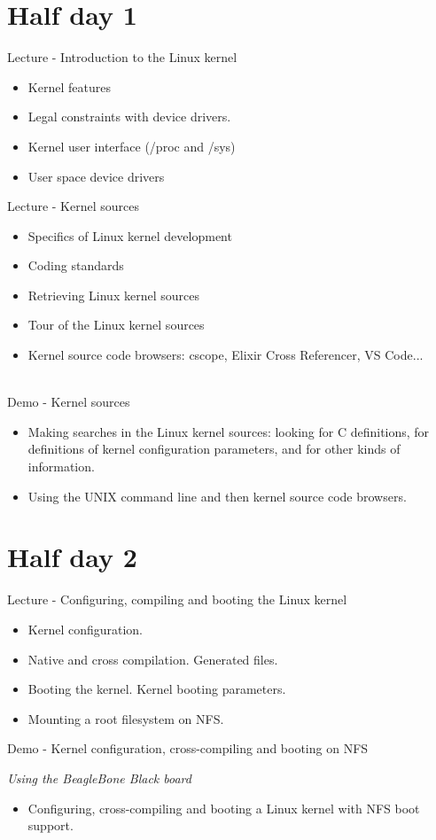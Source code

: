 \documentclass[a4paper,12pt,obeyspaces,spaces,hyphens]{article}
\begin{document}
\section{Half day 1}

\feagendatwocolumn
{Lecture - Introduction to the Linux kernel}
{
  \begin{itemize}
  \item Kernel features
  \item Legal constraints with device drivers.
  \item Kernel user interface (/proc and /sys)
  \item User space device drivers
  \end{itemize}
}
{Lecture - Kernel sources}
{
  \begin{itemize}
  \item Specifics of Linux kernel development
  \item Coding standards
  \item Retrieving Linux kernel sources
  \item Tour of the Linux kernel sources
  \item Kernel source code browsers: cscope,
        Elixir Cross Referencer, VS Code...
  \end{itemize}
}
\\
\feagendaonecolumn
{Demo - Kernel sources}
{
  \begin{itemize}
  \item Making searches in the Linux kernel sources: looking for C
    definitions, for definitions of kernel configuration parameters,
    and for other kinds of information.
  \item Using the UNIX command line and then kernel source code
    browsers.
 \end{itemize}
}

\section{Half day 2}

\feagendatwocolumn
{Lecture - Configuring, compiling and booting the Linux kernel}
{
  \begin{itemize}
  \item Kernel configuration.
  \item Native and cross compilation. Generated files.
  \item Booting the kernel. Kernel booting parameters.
  \item Mounting a root filesystem on NFS.
  \end{itemize}
}
{Demo - Kernel configuration, cross-compiling and booting on NFS}
{
  {\em Using the BeagleBone Black board}
  \begin{itemize}
  \item Configuring, cross-compiling and booting a Linux kernel with
    NFS boot support.
  \end{itemize}
}
\end{document}
